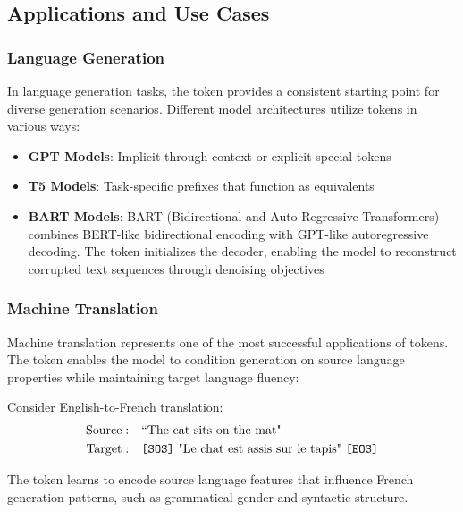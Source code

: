 \subsection{Applications and Use Cases}

\subsubsection{Language Generation}

In language generation tasks, the \sos{} token provides a consistent starting point for diverse generation scenarios. Different model architectures utilize \sos{} tokens in various ways:

\begin{itemize}
\item \textbf{GPT Models}: Implicit \sos{} through context or explicit special tokens
\item \textbf{T5 Models}: Task-specific prefixes that function as \sos{} equivalents
\item \textbf{BART Models}: BART (Bidirectional and Auto-Regressive Transformers) \citep{lewis2020bart} combines BERT-like bidirectional encoding with GPT-like autoregressive decoding. The \sos{} token initializes the decoder, enabling the model to reconstruct corrupted text sequences through denoising objectives
\end{itemize}

\subsubsection{Machine Translation}

Machine translation represents one of the most successful applications of \sos{} tokens. The token enables the model to condition generation on source language properties while maintaining target language fluency:

\begin{example}
Consider English-to-French translation:
\begin{align}
\text{Source}: &\quad \text{``The cat sits on the mat"} \\
\text{Target}: &\quad \text{\texttt{[SOS]}{} "Le chat est assis sur le tapis" \texttt{[EOS]}{}}
\end{align}

The \sos{} token learns to encode source language features that influence French generation patterns, such as grammatical gender and syntactic structure.
\end{example}

